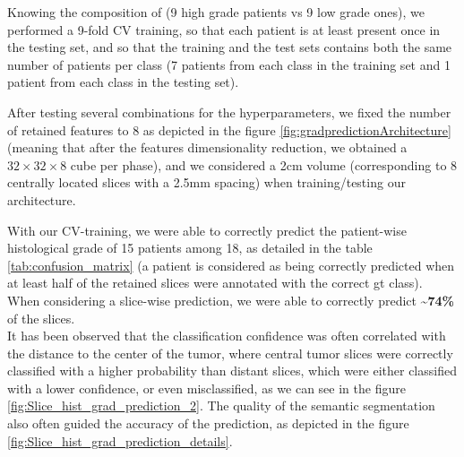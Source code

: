 Knowing the composition of \textbf{} (9 high grade patients vs 9 low
grade ones), we performed a 9-fold CV training, so that each patient is
at least present once in the testing set, and so that the training and
the test sets contains both the same number of patients per
class (7 patients from each class in the training set and 1 patient from
each class in the testing set).

After testing several combinations for the hyperparameters, we
fixed the number of retained features to 8 as depicted in the
figure \ref{fig:gradpredictionArchitecture} (meaning that after the features dimensionality reduction,
we obtained a $ 32\times32\times8 $ cube per phase), and we considered a 2cm volume
(corresponding to 8 centrally located slices with a 2.5mm spacing) when
training/testing our architecture.

With our CV-training, we were able to correctly predict the patient-wise
histological grade of 15 patients among 18, as detailed in the table \ref{tab:confusion_matrix} (a patient is considered as being correctly predicted
when at least half of the retained slices were annotated with the
correct \ac{gt} class).
When considering a slice-wise prediction, we were able to correctly
predict \textbf{\textasciitilde{}74\%} of the slices.\\
It has been observed that the classification confidence was often correlated with the distance to the center of the tumor, where central tumor slices were correctly classified with a higher probability than distant slices, which were either classified with a lower confidence, or even misclassified, as we can see in the figure \ref{fig:Slice_hist_grad_prediction_2}. The quality of the semantic segmentation also often guided the accuracy of the prediction, as depicted in the figure \ref{fig:Slice_hist_grad_prediction_details}.

